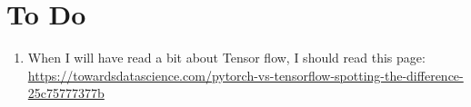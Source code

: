 \documentclass[11pt,a4paper]{article}
\begin{document}
\section{To Do}
\begin{enumerate}
\item When I will have read a bit about Tensor flow, I should read this page:\\
\url{https://towardsdatascience.com/pytorch-vs-tensorflow-spotting-the-difference-25c75777377b}\\
\end{enumerate}
\end{document}
